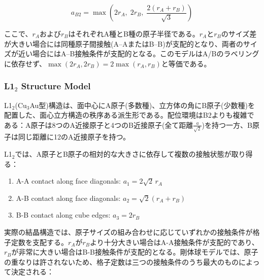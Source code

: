 \documentclass[a4paper,10pt,5p]{elsarticle}
\begin{document}
\begin{equation}
    a_{B2} = \max\!\left(2r_A,\; 2r_B,\; \frac{2(r_A + r_B)}{\sqrt{3}}\right)
    \label{eq:B2}
\end{equation}

ここで、$r_A$および$r_B$はそれぞれA種とB種の原子半径である。$r_A$と$r_B$のサイズ差が大きい場合には同種原子間接触(A--AまたはB--B)が支配的となり、両者のサイズが近い場合にはA--B接触条件が支配的となる。このモデルはA/Bのラベリングに依存せず、$\max(2r_A, 2r_B) = 2\max(r_A, r_B)$と等価である。

\subsubsection{L1$_2$ Structure Model}

L1$_2$(Cu$_3$Au型)構造は、面中心にA原子(多数種)、立方体の角にB原子(少数種)を配置した、面心立方構造の秩序ある派生形である。配位環境はB2よりも複雑である：A原子は8つのA近接原子と4つのB近接原子(全て距離$\frac{a}{\sqrt{2}}$)を持つ一方、B原子は同じ距離に12のA近接原子を持つ。

L1$_2$では、A原子とB原子の相対的な大きさに依存して複数の接触状態が取り得る：



\begin{enumerate}
\setlength{\parskip}{0cm} %
\setlength{\itemsep}{0cm} %
    \item A-A contact along face diagonals: $a_1 = 2\sqrt{2}\, r_A$
    \item A-B contact along face diagonals: $a_2 = \sqrt{2}(r_A + r_B)$
    \item B-B contact along cube edges: $a_3 = 2r_B$
\end{enumerate}

実際の結晶構造では、原子サイズの組み合わせに応じていずれかの接触条件が格子定数を支配する。$r_A$が$r_B$より十分大きい場合はA-A接触条件が支配的であり、$r_B$が非常に大きい場合はB-B接触条件が支配的となる。剛体球モデルでは、原子の重なりは許されないため、格子定数は三つの接触条件のうち最大のものによって決定される：
\end{document}
